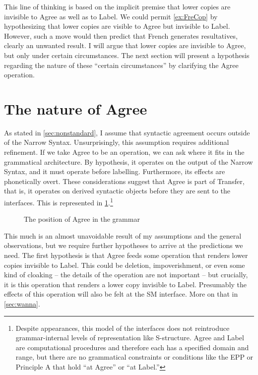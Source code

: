 \documentclass[MilwayThesis]{subfiles}
\begin{document}
This line of thinking is based on the implicit premise that lower copies are invisible to Agree as well as to Label.
We could permit \cref{ex:FreCop} by hypothesizing that lower copies are visible to Agree but invisible to Label.
However, such a move would then predict that French generates resultatives, clearly an unwanted result.
I will argue that lower copies are invisible to Agree, but only under certain circumstances.
The next section will present a hypothesis regarding the nature of these ``certain circumstances'' by clarifying the Agree operation.

\section{The nature of Agree}\label{sec:natureofagree}

As stated in \cref{sec:nonstandard}, I assume that syntactic agreement occurs outside of the Narrow Syntax.
Unsurprisingly, this assumption requires additional refinement.
If we take Agree to be an operation, we can ask where it fits in the grammatical architecture.
By hypothesis, it operates on the output of the Narrow Syntax, and it must operate before labelling.
Furthermore, its effects are phonetically overt.
These considerations suggest that Agree is part of Transfer, that is, it operates on derived syntactic objects before they are sent to the interfaces.
This is represented in \cref{fig:SepCycles}.\footnote{
	Despite appearances, this model of the interfaces does not reintroduce grammar-internal levels of representation like S-structure.
	Agree and Label are computational procedures and therefore each has a specified domain and range, but there are no grammatical constraints or conditions like the EPP or Principle A that hold ``at Agree'' or ``at Label.''
}
\begin{figure}[h]
  \centering
  \caption{The position of Agree in the grammar}
  \label{fig:SepCycles}
\end{figure}

This much is an almost unavoidable result of my assumptions and the general observations, but we require further hypotheses to arrive at the predictions we need.
The first hypothesis is that Agree feeds some operation that renders lower copies invisible to Label.
This could be deletion, impoverishment, or even some kind of cloaking -- the details of the operation are not important -- but crucially, it is this operation that renders a lower copy invisible to Label.
Presumably the effects of this operation will also be felt at the SM interface.
More on that in \cref{sec:wanna}.
\end{document}
